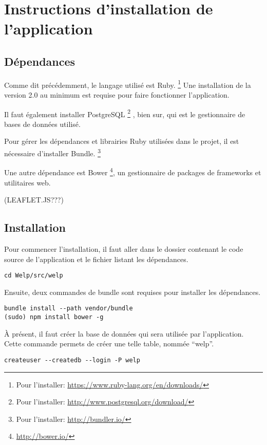 \documentclass[a4paper,10pt]{article}
\begin{document}
\newpage

\section{Instructions d'installation de l'application}

\subsection{Dépendances}

Comme dit précédemment, le langage utilisé est Ruby. \footnote{Pour l'installer: \url{https://www.ruby-lang.org/en/downloads/} } Une installation de la version 2.0 au minimum est requise pour faire fonctionner l'application.

Il faut également installer PostgreSQL \footnote{Pour l'installer: \url{http://www.postgresql.org/download/} } , bien sur, qui est le gestionnaire de bases de données utilisé.

Pour gérer les dépendances et librairies Ruby utilisées dans le projet, il est nécessaire d'installer Bundle. \footnote{Pour l'installer: \url{http://bundler.io/} }

Une autre dépendance est Bower \footnote{\url{http://bower.io/}}, un gestionnaire de packages de frameworks et utilitaires web.

(LEAFLET.JS???)


\subsection{Installation}

Pour commencer l'installation, il faut aller dans le dossier contenant le code source de l'application et le fichier listant les dépendances.

\begin{verbatim}
cd Welp/src/welp
\end{verbatim}

Ensuite, deux commandes de bundle sont requises pour installer les dépendances.

\begin{verbatim}
bundle install --path vendor/bundle
(sudo) npm install bower -g
\end{verbatim}

À présent, il faut créer la base de données qui sera utilisée par l'application. Cette commande permets de créer une telle table, nommée ``welp''.

\begin{verbatim}
createuser --createdb --login -P welp
\end{verbatim}
\end{document}
